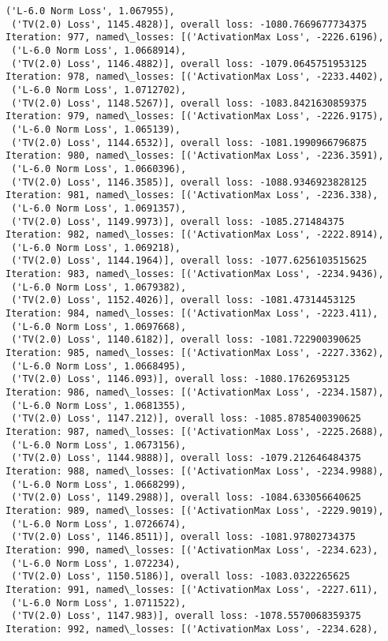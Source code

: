 \documentclass[10pt]{article}
\begin{document}
\begin{Verbatim}[commandchars=\\\{\}]
 ('L-6.0 Norm Loss', 1.067955),
 ('TV(2.0) Loss', 1145.4828)], overall loss: -1080.7669677734375
Iteration: 977, named\_losses: [('ActivationMax Loss', -2226.6196),
 ('L-6.0 Norm Loss', 1.0668914),
 ('TV(2.0) Loss', 1146.4882)], overall loss: -1079.0645751953125
Iteration: 978, named\_losses: [('ActivationMax Loss', -2233.4402),
 ('L-6.0 Norm Loss', 1.0712702),
 ('TV(2.0) Loss', 1148.5267)], overall loss: -1083.8421630859375
Iteration: 979, named\_losses: [('ActivationMax Loss', -2226.9175),
 ('L-6.0 Norm Loss', 1.065139),
 ('TV(2.0) Loss', 1144.6532)], overall loss: -1081.1990966796875
Iteration: 980, named\_losses: [('ActivationMax Loss', -2236.3591),
 ('L-6.0 Norm Loss', 1.0660396),
 ('TV(2.0) Loss', 1146.3585)], overall loss: -1088.9346923828125
Iteration: 981, named\_losses: [('ActivationMax Loss', -2236.338),
 ('L-6.0 Norm Loss', 1.0691357),
 ('TV(2.0) Loss', 1149.9973)], overall loss: -1085.271484375
Iteration: 982, named\_losses: [('ActivationMax Loss', -2222.8914),
 ('L-6.0 Norm Loss', 1.069218),
 ('TV(2.0) Loss', 1144.1964)], overall loss: -1077.6256103515625
Iteration: 983, named\_losses: [('ActivationMax Loss', -2234.9436),
 ('L-6.0 Norm Loss', 1.0679382),
 ('TV(2.0) Loss', 1152.4026)], overall loss: -1081.47314453125
Iteration: 984, named\_losses: [('ActivationMax Loss', -2223.411),
 ('L-6.0 Norm Loss', 1.0697668),
 ('TV(2.0) Loss', 1140.6182)], overall loss: -1081.722900390625
Iteration: 985, named\_losses: [('ActivationMax Loss', -2227.3362),
 ('L-6.0 Norm Loss', 1.0668495),
 ('TV(2.0) Loss', 1146.093)], overall loss: -1080.17626953125
Iteration: 986, named\_losses: [('ActivationMax Loss', -2234.1587),
 ('L-6.0 Norm Loss', 1.0681355),
 ('TV(2.0) Loss', 1147.212)], overall loss: -1085.8785400390625
Iteration: 987, named\_losses: [('ActivationMax Loss', -2225.2688),
 ('L-6.0 Norm Loss', 1.0673156),
 ('TV(2.0) Loss', 1144.9888)], overall loss: -1079.212646484375
Iteration: 988, named\_losses: [('ActivationMax Loss', -2234.9988),
 ('L-6.0 Norm Loss', 1.0668299),
 ('TV(2.0) Loss', 1149.2988)], overall loss: -1084.633056640625
Iteration: 989, named\_losses: [('ActivationMax Loss', -2229.9019),
 ('L-6.0 Norm Loss', 1.0726674),
 ('TV(2.0) Loss', 1146.8511)], overall loss: -1081.97802734375
Iteration: 990, named\_losses: [('ActivationMax Loss', -2234.623),
 ('L-6.0 Norm Loss', 1.072234),
 ('TV(2.0) Loss', 1150.5186)], overall loss: -1083.0322265625
Iteration: 991, named\_losses: [('ActivationMax Loss', -2227.611),
 ('L-6.0 Norm Loss', 1.0711522),
 ('TV(2.0) Loss', 1147.983)], overall loss: -1078.5570068359375
Iteration: 992, named\_losses: [('ActivationMax Loss', -2234.628),

\end{Verbatim}
\end{document}
